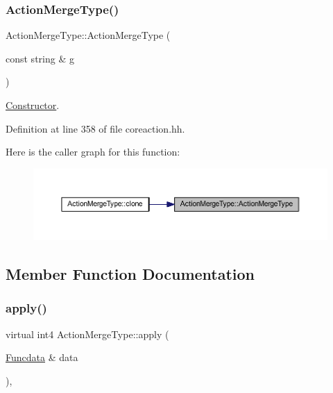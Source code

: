 \subsubsection{\texorpdfstring{ActionMergeType()}{ActionMergeType()}}
{\footnotesize\ttfamily Action\+Merge\+Type\+::\+Action\+Merge\+Type (\begin{DoxyParamCaption}\item[{const string \&}]{g }\end{DoxyParamCaption})\hspace{0.3cm}{\ttfamily [inline]}}



\mbox{\hyperlink{class_constructor}{Constructor}}. 



Definition at line 358 of file coreaction.\+hh.

Here is the caller graph for this function\+:
\nopagebreak
\begin{figure}[H]
\begin{center}
\leavevmode
\includegraphics[width=350pt]{class_action_merge_type_a2513353a5f0d9d7d12a10c4091d496eb_icgraph}
\end{center}
\end{figure}


\subsection{Member Function Documentation}
\mbox{\label{class_action_merge_type_a512152b02f4dedd4d83fb0ddb4f9a990}} 
\subsubsection{\texorpdfstring{apply()}{apply()}}
{\footnotesize\ttfamily virtual int4 Action\+Merge\+Type\+::apply (\begin{DoxyParamCaption}\item[{\mbox{\hyperlink{class_funcdata}{Funcdata}} \&}]{data }\end{DoxyParamCaption})\hspace{0.3cm}{\ttfamily [inline]}, {\ttfamily [virtual]}}



